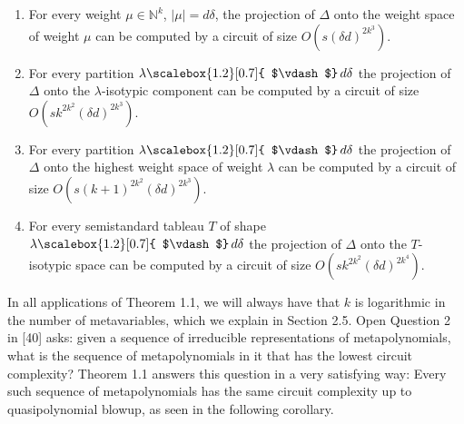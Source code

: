 \documentclass[10pt,a4paper]{article}
\begin{document}
\begin{enumerate}


\item 
 


For every weight $\mu\in\mathbb{N}^{k}$, $|\mu|=d\delta$, the projection of $\Delta$ onto the weight space of weight $\mu$ can be computed by a circuit of size $O(s(\delta d)^{2k^{3}})$.





\item 
 


For every partition $\lambda\mathchoice{\scalebox{1.2}[0.7]{ $\vdash$}\,}{\scalebox{1.2}[0.7]{ $\vdash$}\,}{\scalebox{0.7}{\scalebox{1.2}[0.7]{$\vdash$}}\,}{\scalebox{0.5}{\scalebox{1.2}[0.7]{$\vdash$}}\,}d\delta$ the projection of $\Delta$ onto the $\lambda$-isotypic component can be computed by a circuit of size $O(sk^{2k^{2}}(\delta d)^{2k^{3}})$.





\item 
 


For every partition $\lambda\mathchoice{\scalebox{1.2}[0.7]{ $\vdash$}\,}{\scalebox{1.2}[0.7]{ $\vdash$}\,}{\scalebox{0.7}{\scalebox{1.2}[0.7]{$\vdash$}}\,}{\scalebox{0.5}{\scalebox{1.2}[0.7]{$\vdash$}}\,}d\delta$ the projection of $\Delta$ onto the highest weight space of weight $\lambda$ can be computed by a circuit of size $O(s(k+1)^{2k^{2}}(\delta d)^{2k^{3}})$.





\item 
 


For every semistandard tableau $T$ of shape $\lambda\mathchoice{\scalebox{1.2}[0.7]{ $\vdash$}\,}{\scalebox{1.2}[0.7]{ $\vdash$}\,}{\scalebox{0.7}{\scalebox{1.2}[0.7]{$\vdash$}}\,}{\scalebox{0.5}{\scalebox{1.2}[0.7]{$\vdash$}}\,}d\delta$ the projection of $\Delta$ onto the $T$-isotypic space can be computed by a circuit of size $O(sk^{2k^{2}}(\delta d)^{2k^{4}})$.





\end{enumerate}





In all applications of
Theorem 1.1,
we will always have that $k$ is logarithmic in the number of metavariables, which we explain in Section 2.5.
Open Question 2 in [40] asks: given a sequence of irreducible representations of metapolynomials, what is the sequence of metapolynomials in it that has the lowest circuit complexity? Theorem 1.1 answers this question in a very satisfying way: Every such sequence of metapolynomials has the same circuit complexity up to quasipolynomial blowup, as seen in the following corollary.
\end{document}
